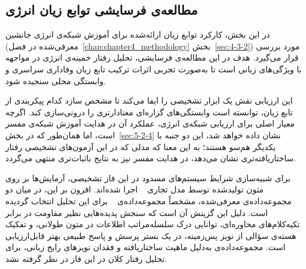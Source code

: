 \subsection{مطالعه‌ی فرسایشی توابع زیان انرژی}\label{sec:5-2-2}

در این بخش، کارکرد توابع زیان ارائه‌شده برای آموزش شبکه‌ی انرژی جانشین (معرفی‌شده در فصل~\ref{chap:chapter4_methodology} بخش~\ref{sec:4-3-2}) مورد بررسی قرار می‌گیرد. هدف در این مطالعه‌ی فرسایشی، تحلیل رفتار خمینه‌ی انرژی در مواجهه با ویژگی‌های زبانی است تا به‌صورت تجربی اثرات ترکیب تابع زیان وفاداری سراسری و وابستگی محلی سنجیده شود.

این ارزیابی نقش یک ابزار تشخیصی را ایفا می‌کند تا مشخص سازد کدام پیکربندی از تابع زیان، توانسته است وابستگی‌های گزاره‌ای معنادارتری را درونی‌سازی کند. اگرچه معیار اصلی برای ارزیابی شبکه‌ی انرژی، عملکرد آن در هدایت آموزش شبکه‌ی مفسر است، اما همان‌طور که در بخش~\ref{sec:5-2-4} نشان داده خواهد شد، این دو جنبه با یکدیگر هم‌سو هستند؛ به این معنا که مدلی که در این آزمون‌های تشخیصی رفتار ساختاریافته‌تری نشان می‌دهد، در هدایت مفسر نیز به نتایج باثبات‌تری منتهی می‌گردد.

برای شبیه‌سازی شرایط سیستم‌های مسدود در این فاز تشخیصی، آزمایش‌ها بر روی متون تولیدشده توسط مدل تجاری ~\cite{openai2023gpt4} اجرا شده‌اند. افزون بر این، در میان دو مجموعه‌داده‌ی معرفی‌شده، مشخصاً مجموعه‌داده‌ی ~\cite{guo2023closechatgpthumanexperts} برای این تحلیل انتخاب گردیده است. دلیل این گزینش آن است که سنجش پدیده‌هایی نظیر مقاومت در برابر تکیه‌کلام‌های محاوره‌ای، توانایی درک سلسله‌مراتب اطلاعات در متون طولانی، و تفکیک هسته‌ی سؤالی از نویز پس‌زمینه، در یک بستر پرسش و پاسخ طبیعی بهتر قابل‌ارزیابی است. مجموعه‌داده‌ی  به‌دلیل ماهیت ساختاریافته و فقدان نویزهای رایج زبانی، برای تحلیل رفتار کلان در این فاز در نظر گرفته نشد.

